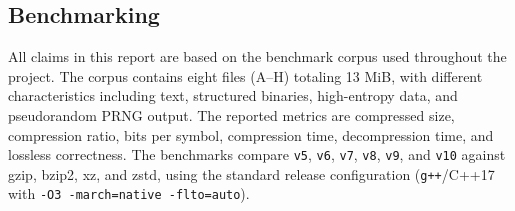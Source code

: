 \subsection{Benchmarking}
All claims in this report are based on the benchmark corpus used throughout the project. The corpus contains eight files (A--H) totaling 13 MiB, with different characteristics including text, structured binaries, high-entropy data, and pseudorandom PRNG output. The reported metrics are compressed size, compression ratio, bits per symbol, compression time, decompression time, and lossless correctness. The benchmarks compare \texttt{v5}, \texttt{v6}, \texttt{v7}, \texttt{v8}, \texttt{v9}, and \texttt{v10} against gzip, bzip2, xz, and zstd, using the standard release configuration (\texttt{g++}/C++17 with \texttt{-O3 -march=native -flto=auto}).

